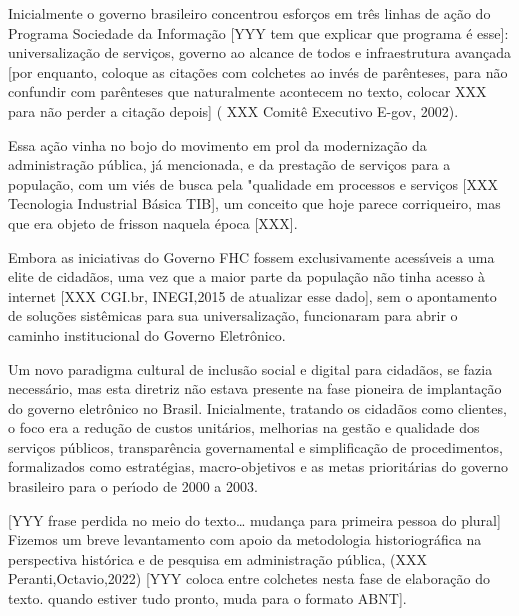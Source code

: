 \documentclass[
12pt,		%
openright,	%
twoside,  %
a4paper,			%
chapter=TITLE,		%
english,			%
french,				%
spanish,			%
brazil				%
]{USPSC-classe/USPSC}
\begin{document}
Inicialmente o governo brasileiro concentrou esfor\c{c}os em tr\^es linhas de a\c{c}\~ao do Programa Sociedade da Informa\c{c}\~ao [YYY tem que explicar que programa \'e esse]: universaliza\c{c}\~ao de servi\c{c}os, governo ao alcance de todos e infraestrutura avan\c{c}ada [por enquanto, coloque as cita\c{c}\~oes com colchetes ao inv\'es de par\^enteses, para n\~ao confundir com par\^enteses que naturalmente acontecem no texto, colocar XXX para n\~ao perder a cita\c{c}\~ao depois] ( XXX Comit\^e Executivo E-gov, 2002).




Essa a\c{c}\~ao vinha no bojo do movimento em prol da moderniza\c{c}\~ao da administra\c{c}\~ao p\'ublica, j\'a mencionada, e da presta\c{c}\~ao de servi\c{c}os para a popula\c{c}\~ao, com um vi\'es de busca pela "qualidade em processos e servi\c{c}os [XXX Tecnologia Industrial B\'asica TIB], um conceito que hoje parece corriqueiro, mas que era objeto de frisson naquela \'epoca [XXX].




Embora as iniciativas do Governo FHC fossem exclusivamente acess\'{\i}veis a uma elite de cidad\~aos, uma vez que a maior parte da popula\c{c}\~ao n\~ao tinha acesso \`a internet [XXX CGI.br, INEGI,2015 de atualizar esse dado], sem o apontamento de solu\c{c}\~oes sist\^emicas para sua universaliza\c{c}\~ao, funcionaram para abrir o caminho institucional do Governo Eletr\^onico.




Um novo paradigma cultural de inclus\~ao social e digital para cidad\~aos, se fazia necess\'ario, mas esta diretriz n\~ao estava presente na fase pioneira de implanta\c{c}\~ao do governo eletr\^onico no Brasil. Inicialmente, tratando os cidad\~aos como clientes, o foco era a redu\c{c}\~ao de custos unit\'arios, melhorias na gest\~ao e qualidade dos servi\c{c}os p\'ublicos, transpar\^encia governamental e simplifica\c{c}\~ao de procedimentos, formalizados como estrat\'egias, macro-objetivos e  as metas priorit\'arias  do governo brasileiro para o per\'{\i}odo de 2000 a 2003.




[YYY frase perdida no meio do texto… mudan\c{c}a para primeira pessoa do plural] Fizemos um breve levantamento com apoio da metodologia historiogr\'afica na  perspectiva hist\'orica e de pesquisa em administra\c{c}\~ao p\'ublica, (XXX Peranti,Octavio,2022) [YYY coloca entre colchetes nesta fase de elabora\c{c}\~ao do texto. quando estiver tudo pronto, muda para o formato ABNT].
\end{document}
